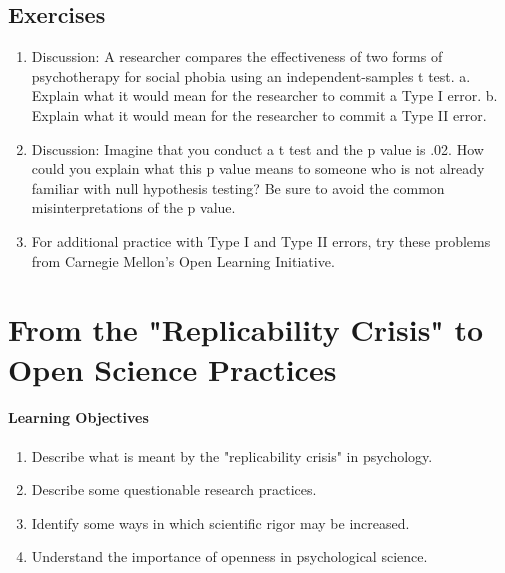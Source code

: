 \subsection{Exercises}
\begin{fullwidth}
\begin{enumerate}
\item Discussion: A researcher compares the effectiveness of two forms of psychotherapy for social phobia using an independent-samples t test.
a. Explain what it would mean for the researcher to commit a Type I error.
b. Explain what it would mean for the researcher to commit a Type II error.

\item Discussion: Imagine that you conduct a t test and the p value is .02. How could you explain what this p value means to someone who is not already familiar with null hypothesis testing? Be sure to avoid the common misinterpretations of the p value.

\item For additional practice with Type I and Type II errors, try these problems from Carnegie Mellon's Open Learning Initiative.


\end{enumerate}
\end{fullwidth}


\section{From the "Replicability Crisis" to Open Science Practices}


\paragraph{Learning Objectives}
    \begin{enumerate}
    \item  Describe what is meant by the "replicability crisis" in psychology.
    \item Describe some questionable research practices.

    \item Identify some ways in which scientific rigor may be increased.

    \item Understand the importance of openness in psychological science.

      \end{enumerate}


